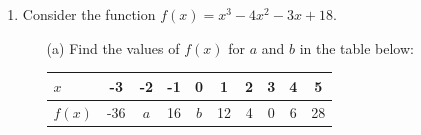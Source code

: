 \documentclass[12pt, oneside]{article}
\begin{document}
\begin{enumerate}
\item Consider the function $f(x) = x^3 - 4x^2 - 3x + 18$.
\begin{itemize}
    \item[(a)] Find the values of $f(x)$ for $a$ and $b$ in the table below:\\
	\begin{tabular}{|l|c|c|c|c|c|c|c|c|c|}
	\hline
	$x$ & -3 & -2 & -1 & 0 & 1 & 2 & 3 & 4 & 5\\
	\hline
    $f(x)$ & -36 & $a$ & 16 & $b$ & 12 & 4 & 0 & 6 & 28\\
	\hline
	\end{tabular}


\end{itemize}
\end{enumerate}

\end{document}
